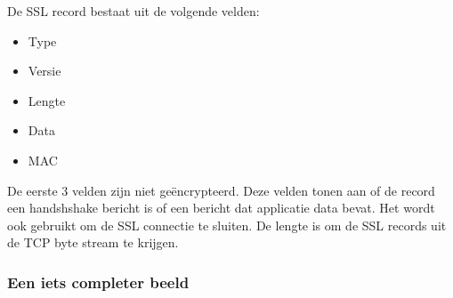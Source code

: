 \clearpage


De SSL record bestaat uit de volgende velden:
\begin{itemize}

\item Type
\item Versie
\item Lengte
\item Data
\item MAC
\end{itemize}

De eerste 3 velden zijn niet geëncrypteerd. Deze velden tonen aan of de record een handshshake bericht is of een bericht dat applicatie data bevat. Het wordt ook gebruikt om de SSL connectie te sluiten. De lengte is om de SSL records uit de TCP byte stream te krijgen.

\clearpage

\subsubsection{Een iets completer beeld}


